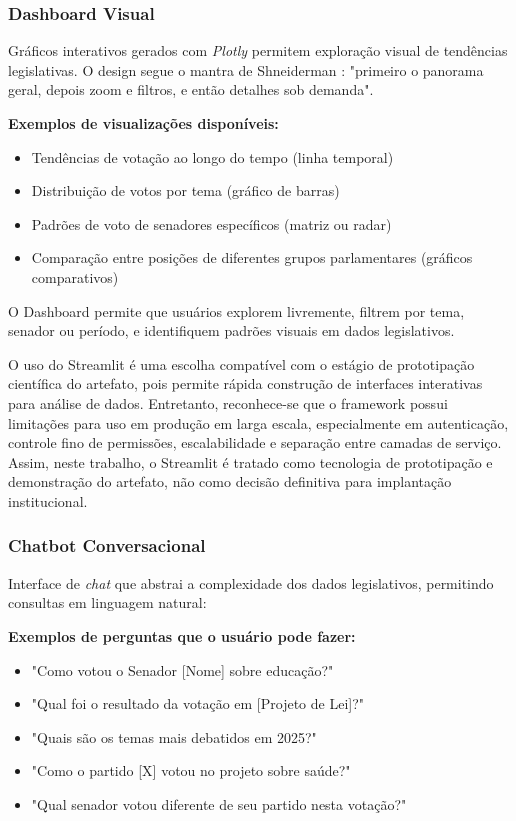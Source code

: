 \subsubsection{Dashboard Visual}

Gráficos interativos gerados com \textit{Plotly} \cite{Plotly2024} permitem exploração visual de tendências legislativas. O design segue o mantra de Shneiderman \cite{Shneiderman1996}: "primeiro o panorama geral, depois zoom e filtros, e então detalhes sob demanda".

\textbf{Exemplos de visualizações disponíveis:}

\begin{itemize}
    \item Tendências de votação ao longo do tempo (linha temporal)
    \item Distribuição de votos por tema (gráfico de barras)
    \item Padrões de voto de senadores específicos (matriz ou radar)
    \item Comparação entre posições de diferentes grupos parlamentares (gráficos comparativos)
\end{itemize}

O Dashboard permite que usuários explorem livremente, filtrem por tema, senador ou período, e identifiquem padrões visuais em dados legislativos.

O uso do Streamlit é uma escolha compatível com o estágio de prototipação científica do artefato, pois permite rápida construção de interfaces interativas para análise de dados. Entretanto, reconhece-se que o framework possui limitações para uso em produção em larga escala, especialmente em autenticação, controle fino de permissões, escalabilidade e separação entre camadas de serviço. Assim, neste trabalho, o Streamlit é tratado como tecnologia de prototipação e demonstração do artefato, não como decisão definitiva para implantação institucional.

\subsubsection{Chatbot Conversacional}

Interface de \textit{chat} que abstrai a complexidade dos dados legislativos, permitindo consultas em linguagem natural:

\textbf{Exemplos de perguntas que o usuário pode fazer:}

\begin{itemize}
    \item "Como votou o Senador [Nome] sobre educação?"
    \item "Qual foi o resultado da votação em [Projeto de Lei]?"
    \item "Quais são os temas mais debatidos em 2025?"
    \item "Como o partido [X] votou no projeto sobre saúde?"
    \item "Qual senador votou diferente de seu partido nesta votação?"
\end{itemize}

